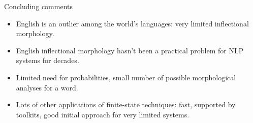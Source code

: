 \documentclass{beamer}
\begin{document}
\begin{frame}{Concluding comments}
  \begin{itemize}
  \item English is an outlier among the world's languages: very
    limited inflectional morphology.
  \item English inflectional morphology hasn't been a practical
    problem for NLP systems for decades.
  \item Limited need for probabilities, small number of possible morphological analyses for a word.
  \item Lots of other applications of finite-state techniques: fast,
    supported by toolkits, good initial approach for very limited
    systems.
  \end{itemize}
\end{frame}
\end{document}

